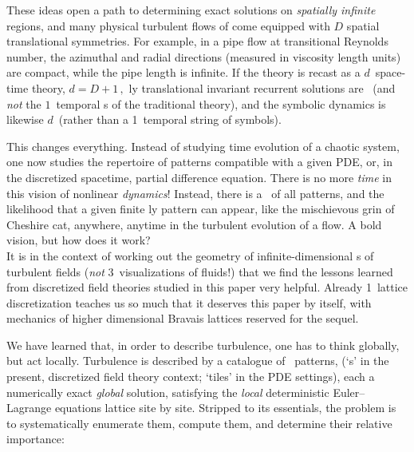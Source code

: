 These ideas open a path to determining exact solutions on \emph{spatially
infinite} regions, and many physical turbulent flows of come equipped
with $D$ spatial translational symmetries. For example, in a pipe flow at
transitional Reynolds number, the azimuthal and radial directions
(measured in viscosity length units) are compact, while the pipe length
is infinite. If the theory is recast as a $d$\dmn\ space-time theory,
\(d= D +1\,,\)
{\spt}ly translational invariant recurrent solutions are \dtors\
(and \emph{not} the $1$\dmn\ temporal \po s of the traditional {\po} theory),
and the symbolic dynamics is likewise $d$\dmn\
(rather than a 1\dmn\ temporal string of symbols).

This changes everything. Instead of studying time evolution of a chaotic
system, one now studies the repertoire of {\spt} patterns compatible with
a given PDE, or, in the discretized spacetime, partial difference
equation. There is no more \emph{time} in this vision of nonlinear
\emph{dynamics}! Instead, there is a \statesp\ of all {\spt} patterns,
and the likelihood that a given finite {\spt}ly pattern can appear, like
the mischievous grin of Cheshire cat, anywhere, anytime in the turbulent
evolution of a flow. A bold vision, but how does it work?
\\

It is in the context of working out the geometry of infinite-dimensional
{\statesp}s of turbulent fields (\emph{not} 3\dmn\ visualizations of
fluids!) that we find the lessons learned from discretized field
theories studied in this paper very helpful.
Already 1\dmn\ lattice discretization teaches us so much that it deserves
this paper by itself, with mechanics of higher dimensional Bravais lattices
reserved for the sequel\rf{CL18}.

We have learned that, in order to describe turbulence, one has to think
globally, but act locally. Turbulence is described by a catalogue of
\spt\ patterns, ({`{\lattstate}s'} in the present, discretized field
theory context; `tiles' in the PDE settings\rf{CL18,GuBuCv17}), each a
numerically exact \emph{global} solution, satisfying the
\emph{local} deterministic Euler–Lagrange equations lattice site by site.
Stripped to its essentials, the problem is to systematically enumerate
them, compute them, and determine their relative importance:

